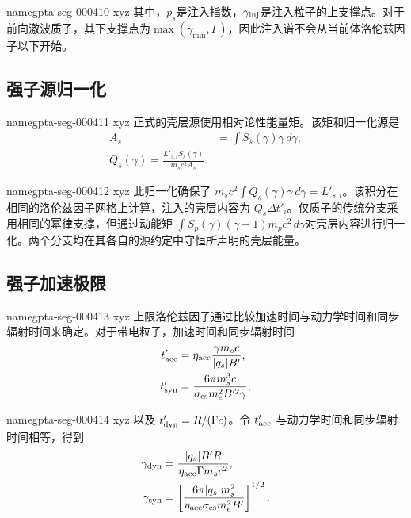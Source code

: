 \documentclass[twocolumn]{aastex702}
\makeatletter
\providecommand{\gptareaderanchor}[1]{\pdfdest name{#1} xyz}%
\providecommand{\gptareaderanchor}[1]{\special{pdf:dest (#1) [ @thispage /XYZ @xpos @ypos null ]}}%
\makeatother
\begin{document}
\gptareaderanchor{gpta-seg-000410}%
其中，\(p_s\)是注入指数，\(\gamma_{\rm inj}\)是注入粒子的上支撑点。对于前向激波质子，其下支撑点为\(\max(\gamma_{\min},\Gamma)\)，因此注入谱不会从当前体洛伦兹因子以下开始。

\subsection{强子源归一化}


\gptareaderanchor{gpta-seg-000411}%
正式的壳层源使用相对论性能量矩。该矩和归一化源是
\begin{equation}
\begin{aligned}
A_s&=\int S_s(\gamma)\gamma\,d\gamma,\\
Q_s(\gamma)=
\frac{L'_{s,i}S_s(\gamma)}{m_sc^2A_s}.
\end{aligned}
\end{equation}

\gptareaderanchor{gpta-seg-000412}%
此归一化确保了
\(m_sc^2\int Q_s(\gamma)\gamma\,d\gamma=L'_{s,i}\)。该积分在相同的洛伦兹因子网格上计算，注入的壳层内容为
\(Q_s\Delta t'_i\)。仅质子的传统分支采用相同的幂律支撑，但通过动能矩
\(\int S_p(\gamma)(\gamma-1)m_pc^2\,d\gamma\)对壳层内容进行归一化。两个分支均在其各自的源约定中守恒所声明的壳层能量。

\subsection{强子加速极限}


\gptareaderanchor{gpta-seg-000413}%
上限洛伦兹因子通过比较加速时间与动力学时间和同步辐射时间来确定。对于带电粒子，加速时间和同步辐射时间
\begin{equation}
\begin{aligned}
t'_{\rm acc}
&=\eta_{\rm acc}\frac{\gamma m_sc}{|q_s|B'},\\
t'_{\rm syn}
&=\frac{6\pi m_s^3c}
{\sigma_{\rm es}m_e^2B'^2\gamma},
\end{aligned}
\end{equation}

\gptareaderanchor{gpta-seg-000414}%
以及 \(t'_{\rm dyn}=R/(\Gamma c)\)。令 \(t'_{\rm acc}\) 与动力学时间和同步辐射时间相等，得到
\begin{equation}
\begin{aligned}
\gamma_{\rm dyn}
&=\frac{|q_s|B'R}{\eta_{\rm acc}\Gamma m_sc^2},\\
\gamma_{\rm syn}
&=\left[\frac{6\pi |q_s|m_s^2}
{\eta_{\rm acc}\sigma_{\rm es}m_e^2B'}\right]^{1/2}.
\end{aligned}
\end{equation}
\end{document}

